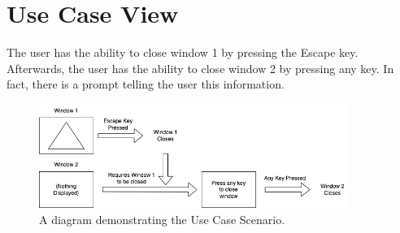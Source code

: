 \section{Use Case View}
\label{section:useCaseView}

The user has the ability to close window 1 by pressing the Escape key.
Afterwards, the user has the ability to close window 2 by pressing any key. In fact, there is a prompt telling the user this information.

\begin{figure}[htb]
    \centering
    \includegraphics[width=10cm]{./Images/UseCaseView.png}
       \caption{A diagram demonstrating the Use Case Scenario.}
           \label{Fig:UseCaseScenario}
\end{figure}